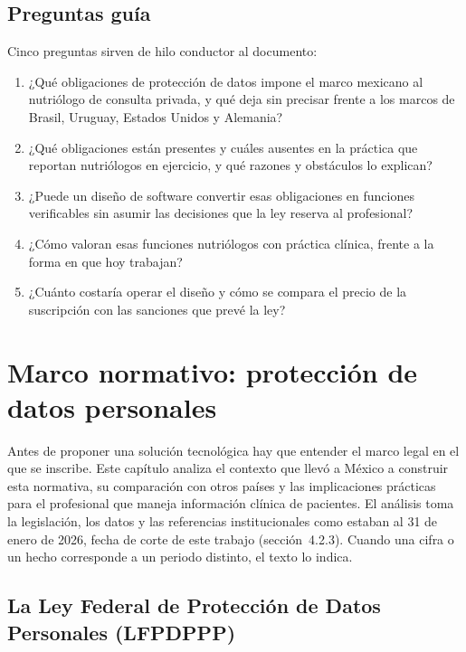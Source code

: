 \documentclass[12pt, a4paper]{article}
\makeatletter
\newcommand{\saltoseccion}{\par
  \ifx\@deferlist\@empty
    \ifdim\pagegoal<\maxdimen
      \ifdim\dimexpr\textheight-\pagegoal+\pagetotal\relax>0.5\textheight\clearpage\fi
    \fi
  \else\clearpage\fi}
\let\seccionbase\section
\renewcommand{\section}{\saltoseccion\seccionbase}
\makeatother
\begin{document}
\subsection{Preguntas guía}
Cinco preguntas sirven de hilo conductor al documento:
 
\begin{enumerate}
  \item ¿Qué obligaciones de protección de datos impone el marco
    mexicano al nutriólogo de consulta privada, y qué deja sin precisar
    frente a los marcos de Brasil, Uruguay, Estados Unidos y Alemania?
  \item ¿Qué obligaciones están presentes y cuáles ausentes en la
    práctica que reportan nutriólogos en ejercicio, y qué razones y
    obstáculos lo explican?
  \item ¿Puede un diseño de software convertir esas obligaciones en
    funciones verificables sin asumir las decisiones que la ley reserva
    al profesional?
  \item ¿Cómo valoran esas funciones nutriólogos con práctica clínica,
    frente a la forma en que hoy trabajan?
  \item ¿Cuánto costaría operar el diseño y cómo se compara el precio de la suscripción con las sanciones que
    prevé la ley?
\end{enumerate}

\section{Marco normativo: protección de datos personales}
Antes de proponer una solución tecnológica hay que entender el marco
legal en el que se inscribe. Este capítulo analiza el contexto que llevó
a México a construir esta normativa, su comparación con otros países y
las implicaciones prácticas para el profesional que maneja información
clínica de pacientes. El análisis toma la legislación, los datos y las
referencias institucionales como estaban al 31 de enero de 2026, fecha
de corte de este trabajo (sección~4.2.3). Cuando una cifra o un hecho
corresponde a un periodo distinto, el texto lo indica.
 
\subsection[La Ley Federal de Protección de Datos Personales (LFPDPPP)]{La Ley Federal de Protección de Datos\\ Personales (LFPDPPP)}
 
\end{document}
